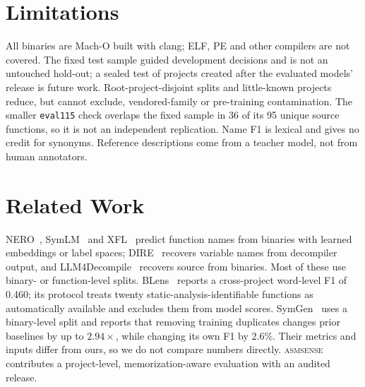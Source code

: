 \documentclass[conference]{IEEEtran}
\newcommand{\tool}{\textsc{asmsense}\xspace}
\begin{document}
\section{Limitations}
All binaries are Mach-O built with clang; ELF, PE and other compilers are not covered. The fixed test sample guided development decisions and is not an untouched hold-out; a sealed test of projects created after the evaluated models' release is future work. Root-project-disjoint splits and little-known projects reduce, but cannot exclude, vendored-family or pre-training contamination. The smaller \texttt{eval115} check overlaps the fixed sample in 36 of its 95 unique source functions, so it is not an independent replication. Name F1 is lexical and gives no credit for synonyms. Reference descriptions come from a teacher model, not from human annotators.

\section{Related Work}
NERO~\cite{nero}, SymLM~\cite{symlm} and XFL~\cite{xfl} predict function names from binaries with learned embeddings or label spaces; DIRE~\cite{dire} recovers variable names from decompiler output, and LLM4Decompile~\cite{llm4decompile} recovers source from binaries. Most of these use binary- or function-level splits. BLens~\cite{blens} reports a cross-project word-level F1 of 0.460; its protocol treats twenty static-analysis-identifiable functions as automatically available and excludes them from model scores. SymGen~\cite{symgen} uses a binary-level split and reports that removing training duplicates changes prior baselines by up to $2.94\times$, while changing its own F1 by 2.6\%. Their metrics and inputs differ from ours, so we do not compare numbers directly. \tool contributes a project-level, memorization-aware evaluation with an audited release.



\end{document}
